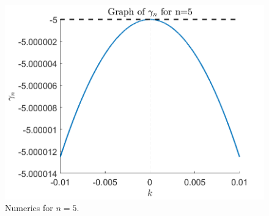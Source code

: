 \documentclass[]{article}
\begin{document}
	\begin{figure}
		\centering
		\includegraphics[width = .5\textwidth]{../Numerics/gamma_n5}
		\caption{Numerics for $n = 5$.}
	\end{figure}
	
\end{document}
